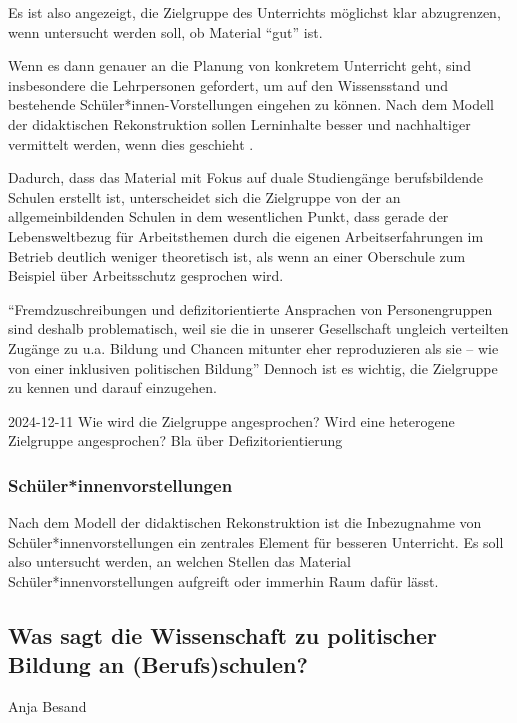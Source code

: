 Es ist also angezeigt, die Zielgruppe des Unterrichts möglichst klar abzugrenzen, wenn untersucht werden soll, ob Material \enquote{gut} ist. 


Wenn es dann genauer an die Planung von konkretem Unterricht geht, sind insbesondere die Lehrpersonen gefordert, um auf den Wissensstand und bestehende Schüler*innen-Vorstellungen eingehen zu können. Nach dem Modell der didaktischen Rekonstruktion sollen Lerninhalte besser und nachhaltiger vermittelt werden, wenn dies geschieht \autocite[404-406]{Reinfried2009}.

Dadurch, dass das Material mit Fokus auf duale Studiengänge berufsbildende Schulen erstellt ist, unterscheidet sich die Zielgruppe von der an allgemeinbildenden Schulen in dem wesentlichen Punkt, dass gerade der Lebensweltbezug für Arbeitsthemen durch die eigenen Arbeitserfahrungen im Betrieb deutlich weniger theoretisch ist, als wenn an einer Oberschule zum Beispiel über Arbeitsschutz gesprochen wird. 

\enquote{Fremdzuschreibungen und defizitorientierte Ansprachen von Personengruppen sind deshalb problematisch, weil sie die in unserer Gesellschaft ungleich verteilten Zugänge zu u.a. Bildung und Chancen mitunter eher reproduzieren als sie – wie von einer inklusiven politischen Bildung} \autocite[]{Beckmann2022}
Dennoch ist es wichtig, die Zielgruppe zu kennen und darauf einzugehen.



2024-12-11
Wie wird die Zielgruppe angesprochen?
Wird eine heterogene Zielgruppe angesprochen?
Bla über Defizitorientierung

\subsubsection{Schüler*innenvorstellungen}
Nach dem Modell der didaktischen Rekonstruktion \autocite[]{Reinfried2009} ist die Inbezugnahme von Schüler*innenvorstellungen ein zentrales Element für besseren Unterricht.
Es soll also untersucht werden, an welchen Stellen das Material Schüler*innenvorstellungen aufgreift oder immerhin Raum dafür lässt. 

\subsection{Was sagt die Wissenschaft zu politischer Bildung an (Berufs)schulen?}
Anja Besand

